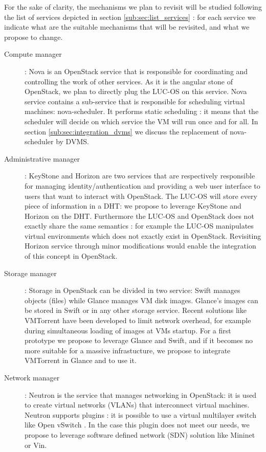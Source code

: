 For the sake of clarity, the mechanisms we plan to revisit will be studied 
following the list of services depicted in section \ref{sub:sec:list_services} :
for each service we indicate what are the suitable mechanisms that will be 
revisited, and what we propose to change.

\begin{description}

	\item [Compute manager] : Nova is an OpenStack service that is 
	responsible for coordinating and controlling the work of other services.
	As it is the angular stone of OpenStack, we plan to directly plug the 
	LUC-OS on this service. Nova service contains a sub-service that is
	responsible for scheduling virtual machines: nova-scheduler. It performs
	static scheduling : it means that the scheduler will decide on which
	service the VM will run once and for all. In section 
	\ref{sub:sec:integration_dvms} we discuss the replacement of 
	nova-scheduler by DVMS.


	\item [Administrative manager] : KeyStone and Horizon are two services
	that are respectively responsible for managing identity/authentication
	and providing a web user interface to users that want to interact with
	OpenStack. The LUC-OS will store every piece of information in a DHT: we
	propose to leverage KeyStone and Horizon on the DHT. Furthermore the 
	LUC-OS and OpenStack does not exactly share the same semantics : for
	example the LUC-OS manipulates virtual environments which does not
	exactly exist in OpenStack. Revisiting Horizon service through minor
	modifications would enable the integration of this concept in OpenStack.

	\item [Storage manager] : Storage in OpenStack can be divided in two
	service: Swift manages objects (files) while Glance manages VM disk
	images. Glance's images can be stored in Swift or in any other storage
	service. Recent solutions like VMTorrent \cite{reich:2012} have been
	developed to limit network overhead, for example during simultaneous 
	loading of images at VMs startup. For a first prototype we propose to 
	leverage Glance and Swift, and if it becomes no more suitable for a
	massive infrastucture, we propose to integrate VMTorrent in Glance and 
	to use it.

	\item [Network manager] : Neutron is the service that manages networking
	in OpenStack: it is used to create virtual networks (VLANs) that
	interconnect virtual machines. Neutron supports plugins : it is possible
	to use a virtual multilayer switch like Open vSwitch \cite{pfaff:2009}.
	In the case this plugin does not meet our needs, we propose to 
	leverage software defined network (SDN) solution like Mininet 
	\cite{lantz:2010} or Vin.

\end{description}




